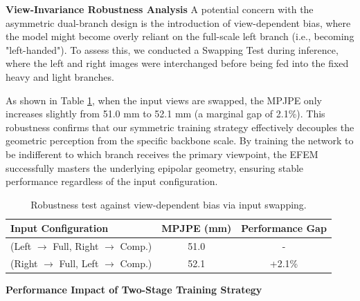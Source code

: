\documentclass[journal]{IEEEtran}
\begin{document}
\textbf{View-Invariance Robustness Analysis} A potential concern with the asymmetric dual-branch design is the introduction of view-dependent bias, where the model might become overly reliant on the full-scale left branch (i.e., becoming "left-handed"). To assess this, we conducted a Swapping Test during inference, where the left and right images were interchanged before being fed into the fixed heavy and light branches.

As shown in Table \ref{tab:swap_test}, when the input views are swapped, the MPJPE only increases slightly from 51.0 mm to 52.1 mm (a marginal gap of 2.1\%). This robustness confirms that our symmetric training strategy effectively decouples the geometric perception from the specific backbone scale. By training the network to be indifferent to which branch receives the primary viewpoint, the EFEM successfully masters the underlying epipolar geometry, ensuring stable performance regardless of the input configuration.

\begin{table}[htbp]
\centering
\caption{Robustness test against view-dependent bias via input swapping.}
\label{tab:swap_test}
\begin{tabular}{@{}lcc@{}}

\hline
\textbf{Input Configuration} & \textbf{MPJPE (mm)} & \textbf{Performance Gap} \\
\hline
(Left $\to$ Full, Right $\to$ Comp.) & 51.0 & - \\
\hline
(Right $\to$ Full, Left $\to$ Comp.) & 52.1 & +2.1\% \\
\hline
\end{tabular}
\end{table}

\textbf{Performance Impact of Two-Stage Training Strategy}
\end{document}
